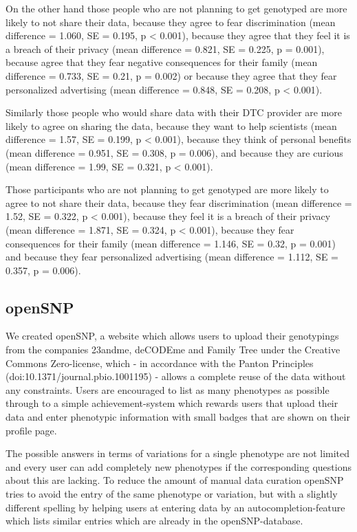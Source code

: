 \documentclass[10pt]{article}
\begin{document}
On the other hand those people who are not planning to get genotyped are more likely to not share their data, because they agree to fear discrimination (mean difference = 1.060, SE = 0.195, p < 0.001), because they agree that they feel it is a breach of their privacy (mean difference = 0.821, SE = 0.225, p = 0.001), because agree that they fear negative consequences for their family (mean difference = 0.733, SE = 0.21, p = 0.002) or because they agree that they fear personalized advertising (mean difference = 0.848, SE = 0.208, p < 0.001).

Similarly those people who would share data with their DTC provider are more likely to agree on sharing the data, because they want to help scientists (mean difference = 1.57, SE = 0.199, p < 0.001), because they think of personal benefits (mean difference = 0.951, SE = 0.308, p = 0.006), and because they are curious (mean difference = 1.99, SE = 0.321, p < 0.001). 

Those participants who are not planning to get genotyped are more likely to agree to not share their data, because they fear discrimination (mean difference = 1.52, SE = 0.322, p < 0.001), because they feel it is a breach of their privacy (mean difference = 1.871, SE = 0.324, p < 0.001), because they fear consequences for their family (mean difference = 1.146, SE = 0.32, p = 0.001) and because they fear personalized advertising (mean difference =  1.112, SE = 0.357, p = 0.006). 

\subsection*{openSNP}
We created openSNP, a website which allows users to upload their genotypings from the companies 23andme, deCODEme and Family Tree under the Creative Commons Zero-license, which - in accordance with the Panton Principles (doi:10.1371/journal.pbio.1001195) - allows a complete reuse of the data without any constraints. Users are encouraged to list as many phenotypes as possible through to a simple achievement-system which rewards users that upload their data and enter phenotypic information with small badges that are shown on their profile page. 

The possible answers in terms of variations for a single phenotype are not limited and every user can add completely new phenotypes if the corresponding questions about this are lacking. To reduce the amount of manual data curation openSNP tries to avoid the entry of the same phenotype or variation, but with a slightly different spelling by helping users at entering data by an autocompletion-feature which lists similar entries which are already in the openSNP-database.
\end{document}

